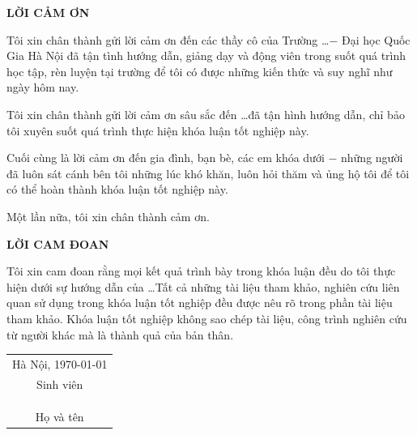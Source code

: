 \documentclass{thesis}
\begin{document}
\pagebreak


\begin{titlepage}
    \begin{center}
        \bf{LỜI CẢM ƠN}
    \end{center}

    \par Tôi xin chân thành gửi lời cảm ơn đến các thầy cô của Trường \ldots $-$ Đại học Quốc Gia Hà Nội đã tận tình hướng dẫn, giảng dạy và động viên trong suốt quá trình học tập, rèn luyện tại trường để tôi có được những kiến thức và suy nghĩ như ngày hôm nay.
    
    \par Tôi xin chân thành gửi lời cảm ơn sâu sắc đến \ldots đã tận hình hướng dẫn, chỉ bảo tôi xuyên suốt quá trình thực hiện khóa luận tốt nghiệp này.
    
    \par Cuối cùng là lời cảm ơn đến gia đình, bạn bè, các em khóa dưới $-$ những người đã luôn sát cánh bên tôi những lúc khó khăn, luôn hỏi thăm và ủng hộ tôi để tôi có thể hoàn thành khóa luận tốt nghiệp này.
    
    \par Một lần nữa, tôi xin chân thành cảm ơn.
\end{titlepage}
\pagebreak
    
\begin{titlepage}
    \begin{center}
        \bf{LỜI CAM ĐOAN}
    \end{center}
    
    \par Tôi xin cam đoan rằng mọi kết quả trình bày trong khóa luận đều do tôi thực hiện dưới sự hướng dẫn của \ldots Tất cả những tài liệu tham khảo, nghiên cứu liên quan sử dụng trong khóa luận tốt nghiệp đều được nêu rõ trong phần tài liệu tham khảo. Khóa luận tốt nghiệp không sao chép tài liệu, công trình nghiên cứu từ người khác mà là thành quả của bản thân. 
    
    \begin{flushright}
        \begin{tabular}{@{}c@{}}
        Hà Nội, \MakeLowercase{\today}\\
        Sinh viên \\
        \\
        \\
        \\
        Họ và tên
        \end{tabular}
    \end{flushright}
\end{titlepage}
\end{document}
